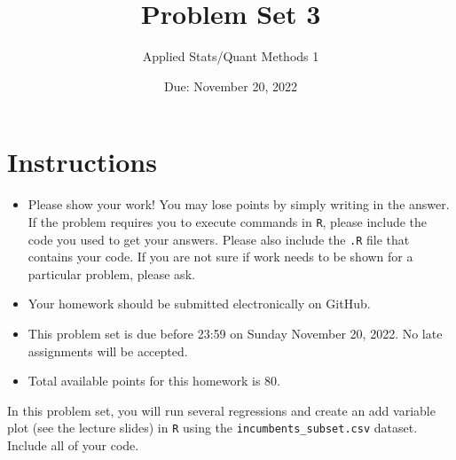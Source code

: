 \documentclass[12pt,letterpaper]{article}
\title{Problem Set 3}
\date{Due: November 20, 2022}
\author{Applied Stats/Quant Methods 1}
\begin{document}
	\maketitle
	\section*{Instructions}
	\begin{itemize}
		\item Please show your work! You may lose points by simply writing in the answer. If the problem requires you to execute commands in \texttt{R}, please include the code you used to get your answers. Please also include the \texttt{.R} file that contains your code. If you are not sure if work needs to be shown for a particular problem, please ask.
		\item Your homework should be submitted electronically on GitHub.
		\item This problem set is due before 23:59 on Sunday November 20, 2022. No late assignments will be accepted.
		\item Total available points for this homework is 80.
	\end{itemize}
	
	\vspace{.25cm}
	
	\noindent In this problem set, you will run several regressions and create an add variable plot (see the lecture slides) in \texttt{R} using the \texttt{incumbents\_subset.csv} dataset. Include all of your code.
	
	\vspace{.5cm}
\end{document}
